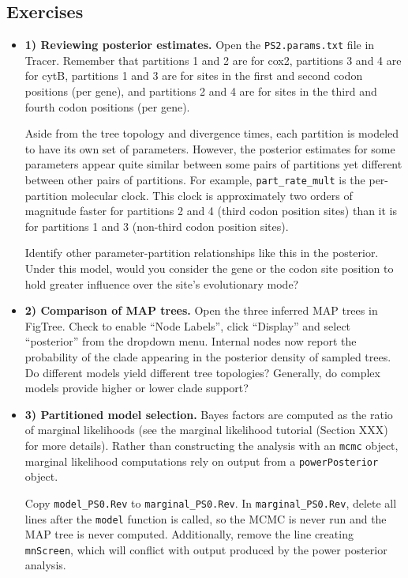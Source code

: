 \subsection{Exercises}
\begin{itemize}

\item {\bf 1) Reviewing posterior estimates.} Open the {\tt PS2.params.txt} file in Tracer. Remember that partitions 1 and 2 are for cox2, partitions 3 and 4 are for cytB, partitions 1 and 3 are for sites in the first and second codon positions (per gene), and partitions 2 and 4 are for sites in the third and fourth codon positions (per gene).

Aside from the tree topology and divergence times, each partition is modeled to have its own set of parameters.
However, the posterior estimates for some parameters appear quite similar between some pairs of partitions yet different between other pairs of partitions.
For example, {\tt part\_rate\_mult} is the per-partition molecular clock.
This clock is approximately two orders of magnitude faster for partitions 2 and 4 (third codon position sites) than it is for partitions 1 and 3 (non-third codon position sites).

Identify other parameter-partition relationships like this in the posterior.
Under this model, would you consider the gene or the codon site position to hold greater influence over the site's evolutionary mode?

\item {\bf 2) Comparison of MAP trees.} Open the three inferred MAP trees in FigTree.
Check to enable ``Node Labels'', click ``Display'' and select ``posterior'' from the dropdown menu.
Internal nodes now report the probability of the clade appearing in the posterior density of sampled trees.
Do different models yield different tree topologies?
Generally, do complex models provide higher or lower clade support?

\item {\bf 3) Partitioned model selection.}
Bayes factors are computed as the ratio of marginal likelihoods (see the marginal likelihood tutorial (Section XXX) for more details).
Rather than constructing the analysis with an {\tt mcmc} object, marginal likelihood computations rely on output from a {\tt powerPosterior} object.

Copy {\tt model\_PS0.Rev} to {\tt marginal\_PS0.Rev}.
In {\tt marginal\_PS0.Rev}, delete all lines after the {\tt model} function is called, so the MCMC is never run and the MAP tree is never computed.
Additionally, remove the line creating {\tt mnScreen}, which will conflict with output produced by the power posterior analysis.




\end{itemize}

